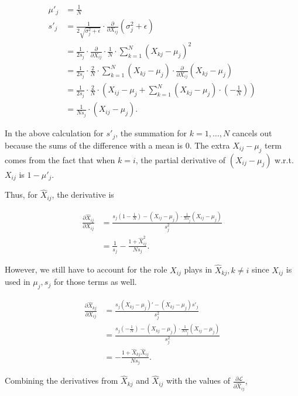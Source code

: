 \documentclass[answers]{exam}
\begin{document}
\begin{questions}
\begin{parts}
\begin{solution}
\begin{align*}
\mu'_{j} &= \frac{1}{N} \\ 
s'_{j} &= \frac{1}{2\sqrt{\sigma^2_{j}+\epsilon}} \cdot \frac{\partial}{\partial X_{ij}} (\sigma^2_{j} + \epsilon) \\ 
&= \frac{1}{2s_{j}} \cdot \frac{\partial}{\partial X_{ij}} \cdot \frac{1}{N} \cdot \sum_{k=1}^{N} (X_{kj} - \mu_{j})^2 \\
&= \frac{1}{2s_{j}} \cdot \frac{2}{N} \cdot \sum_{k=1}^{N} (X_{kj} - \mu_{j}) \cdot \frac{\partial}{\partial X_{ij}} (X_{kj}-\mu_{j}) \\
&= \frac{1}{2s_{j}} \cdot \frac{2}{N} \cdot \left( X_{ij} - \mu_{j} + \sum_{k=1}^{N} (X_{kj} - \mu_{j}) \cdot \left( -\frac{1}{N} \right) \right) \\
&= \frac{1}{Ns_{j}} \cdot \left( X_{ij} - \mu_{j}\right).
\end{align*}

In the above calculation for $s'_{j}$, the summation for $k=1,\ldots,N$ cancels
out because the sums of the difference with a mean is 0. The extra 
$X_{ij} - \mu_{j}$ term comes from the fact that when $k=i$, the partial
derivative of $(X_{ij} - \mu_{j})$ w.r.t. $X_{ij}$ is $1 - \mu'_{j}$.

Thus, for $\hat{X}_{ij}$, the derivative is 

\begin{align*}
\frac{\partial \hat{X}_{ij}}{\partial X_{ij}} &= 
\frac{s_{j}(1 - \frac{1}{N}) - (X_{ij} - \mu_{j}) \cdot \frac{1}{Ns_{j}} (X_{ij} - \mu_{j})}{s_{j}^2} \\
&= \frac{1}{s_{j}} - \frac{1 + \hat{X}_{ij}^2}{Ns_{j}}
.\end{align*}

However, we still have to account for the role $X_{ij}$ plays in $\hat{X}_{kj},
k\neq i$ since $ X_{ij}$ is used in $\mu_{j}, s_{j}$ for those terms as well.

\begin{align*}
\frac{\partial \hat{X}_{kj}}{\partial X_{ij}} &= \frac{s_{j}(X_{kj}-\mu_{j})' - (X_{kj} - \mu_{j})s'_{j}}{s_{j}^2} \\ 
&= \frac{s_{j}\left( -\frac{1}{N} \right) - (X_{kj}-\mu_{j}) \cdot \frac{1}{Ns_{j}}(X_{ij}-\mu_{j})}{s_{j}^2} \\
&= -\frac{1 + \hat{X}_{kj}\hat{X}_{ij}}{Ns_{j}}
.\end{align*}

Combining the derivatives from $\hat{X}_{kj}$ and $\hat{X}_{ij}$ with the values
of $\frac{\partial \mathcal{L}}{\partial \hat{X}_{ij}}$,


\end{solution}
\end{parts}
\end{questions}
\end{document}
